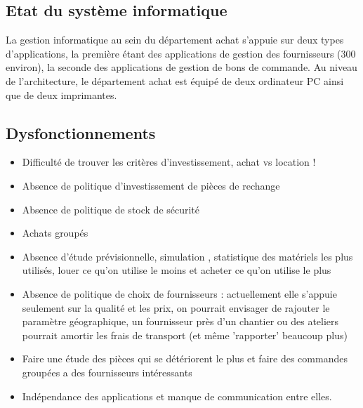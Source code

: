 \subsection{Etat du système informatique}
La gestion informatique au sein du département achat s'appuie sur deux types d'applications, la première étant des applications de gestion des fournisseurs (300 environ), la seconde des applications de gestion de bons de commande.
Au niveau de l'architecture, le département achat est équipé de deux ordinateur PC ainsi que de deux imprimantes.



\subsection{Dysfonctionnements}

\begin{itemize}
    \item Difficulté de trouver les critères d'investissement, achat vs location !
    \item Absence de politique d'investissement de pièces de rechange
    \item Absence de politique de stock de sécurité
    \item Achats groupés
    \item Absence d'étude prévisionnelle, simulation , statistique des matériels les plus utilisés, louer ce qu'on utilise le moins et acheter ce qu'on utilise le plus
    \item Absence de politique de choix de fournisseurs : actuellement elle s'appuie seulement sur la qualité et les prix, on pourrait envisager de rajouter le paramètre géographique, un fournisseur près d'un chantier ou des ateliers pourrait amortir les frais de transport (et même 'rapporter' beaucoup plus)


    \item Faire une étude des pièces qui se détériorent le plus et faire des commandes groupées a des fournisseurs intéressants


    \item Indépendance des applications et manque de communication entre elles.
\end{itemize}